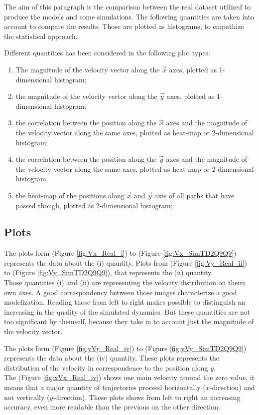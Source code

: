 \documentclass[class=article, crop=false]{standalone}
\begin{document}
The aim of this paragraph is the comparison between the real dataset utilized to produce the models and some simulations.
The following quantities are taken into account to compare the results.
Those are plotted as histograms, to empathize the statistical approach.

Different quantities has been considered in the following plot types:
\begin{enumerate}[label=(\roman*)]
\item The magnitude of the velocity vector along the $\vec x$ axes, plotted as 1-dimensional histogram;
\item the magnitude of the velocity vector along the $\vec y$ axes, plotted as 1-dimensional histogram;
\item the correlation between the position along the $\vec x$ axes and the magnitude of the velocity vector along the same axes, plotted as heat-map or 2-dimensional histogram;
\item the correlation between the position along the $\vec y$ axes and the magnitude of the velocity vector along the same axes, plotted as heat-map or 2-dimensional histogram.
\item the heat-map of the positions along $\vec x$ and $\vec y$ axis of all paths that have passed though, plotted as 2-dimensional histogram;
\end{enumerate}

\FloatBarrier
\subsection{Plots}


The plots form (Figure \ref{fig:Vx_Real_i}) to (Figure \ref{fig:Vx_SimTD2Q9Q9}) represents the data about the (i) quantity.
Plots from (Figure \ref{fig:Vy_Real_ii}) to (Figure \ref{fig:Vy_SimTD2Q9Q9}), that represents the (ii) quantity.
\\ Those quantities (i) and (ii) are representing the velocity distribution on theirs own axes.
A good correspondency between those images characterize a good modelization.
Reading those from left to right makes possible to distinguish an increasing in the quality of the simulated dynamics.
But these quantities are not too significant by themself, because they take in to account just the magnitude of the velocity vector.


The plots form (Figure \ref{fig:yVy_Real_iv}) to (Figure \ref{fig:yVy_SimTD2Q9Q9}) represents the data about the (iv) quantity.
These plots represents the distribution of the velocity in correspondence to the position along $y$.
\\ The (Figure \ref{fig:xVx_Real_iv}) shows one main velocity around the zero value, it means that a major quantity of trajectories proceed horizontally ($x$-direction) and not vertically ($y$-direction).
These plots shows from left to right an increasing accuracy, even more readable than the previous on the other direction.
\end{document}
